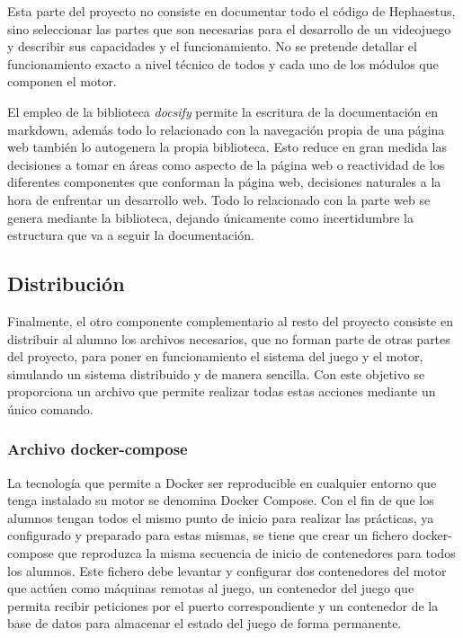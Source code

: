 Esta parte del proyecto no consiste en documentar todo el código de Hephaestus, sino seleccionar las partes que son necesarias para el desarrollo de un videojuego y describir sus capacidades y el funcionamiento. No se pretende detallar el funcionamiento exacto a nivel técnico de todos y cada uno de los módulos que componen el motor.

El empleo de la biblioteca \textit{docsify} permite la escritura de la documentación en markdown, además todo lo relacionado con la navegación propia de una página web también lo autogenera la propia biblioteca. Esto reduce en gran medida las decisiones a tomar en áreas como aspecto de la página web o reactividad de los diferentes componentes que conforman la página web, decisiones naturales a la hora de enfrentar un desarrollo web. Todo lo relacionado con la parte web se genera mediante la biblioteca, dejando únicamente como incertidumbre la estructura que va a seguir la documentación.

\subsection{Distribución}

Finalmente, el otro componente complementario al resto del proyecto consiste en distribuir al alumno los archivos necesarios, que no forman parte de otras partes del proyecto, para poner en funcionamiento el sistema del juego y el motor, simulando un sistema distribuido y de manera sencilla. Con este objetivo se proporciona un archivo que permite realizar todas estas acciones mediante un único comando.

\subsubsection{Archivo docker-compose}

La tecnología que permite a Docker ser reproducible en cualquier entorno que tenga instalado su motor se denomina Docker Compose. Con el fin de que los alumnos tengan todos el mismo punto de inicio para realizar las prácticas, ya configurado y preparado para estas mismas, se tiene que crear un fichero docker-compose que reproduzca la misma secuencia de inicio de contenedores para todos los alumnos. Este fichero debe levantar y configurar dos contenedores del motor que actúen como máquinas remotas al juego, un contenedor del juego que permita recibir peticiones por el puerto correspondiente y un contenedor de la base de datos para almacenar el estado del juego de forma permanente.